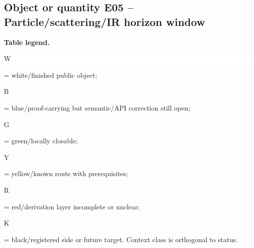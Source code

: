 \subsection*{Object or quantity E05 -- Particle/\allowbreak{}scattering/\allowbreak{}IR horizon window}
\hypertarget{objproof:E05}{}
\par\smallskip\noindent\begin{minipage}{0.99\linewidth}\footnotesize\raggedright\textbf{Table legend.} \colorbox{white}{\strut W} = white/finished public object; \colorbox{cyan!20}{\strut B} = blue/proof-carrying but semantic/API correction still open; \colorbox{green!18}{\strut G} = green/locally closable; \colorbox{yellow!25}{\strut Y} = yellow/known route with prerequisites; \colorbox{red!20}{\strut R} = red/derivation layer incomplete or unclear; \colorbox{black!18}{\strut K} = black/registered side or future target. Context class is orthogonal to status.\end{minipage}\par\vspace{0.25em}
